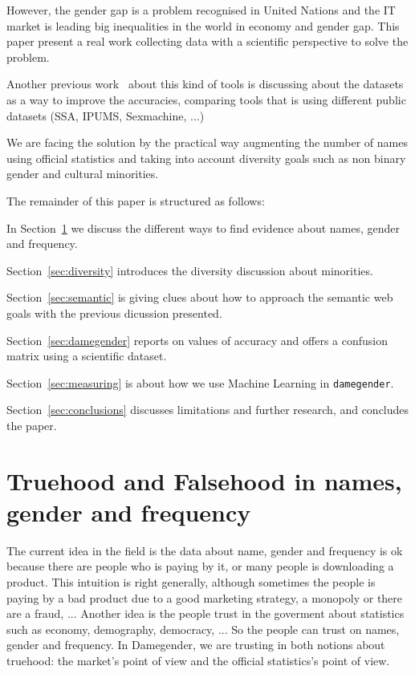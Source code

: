\documentclass[a4paper]{article}
\begin{document}
However, the gender gap is a problem recognised in United Nations and
the IT market is leading big inequalities in the world in economy and
gender gap. This paper present a real work collecting data with a
scientific perspective to solve the problem.

Another previous work~\cite{karimi2016inferring} about this kind of
tools is discussing about the datasets as a way to improve the
accuracies, comparing tools that is using different public datasets
(SSA, IPUMS, Sexmachine, ...)

We are facing the solution by the practical way augmenting the number
of names using official statistics and taking into account diversity
goals such as non binary gender and cultural minorities.

The remainder of this paper is structured as follows:

In Section~\ref{sec:truehood} we discuss the different ways to find
evidence about names, gender and frequency.

Section~\ref{sec:diversity} introduces the diversity discussion about
minorities.

Section~\ref{sec:semantic} is giving clues about how to approach the
semantic web goals with the previous dicussion presented.

Section~\ref{sec:damegender} reports on values of accuracy and offers
a confusion matrix using a scientific dataset.

Section~\ref{sec:measuring} is about how we use Machine Learning in
\texttt{damegender}.

Section~\ref{sec:conclusions} discusses limitations and further
research, and concludes the paper.

\section{Truehood and Falsehood in names, gender and frequency}
\label{sec:truehood}

The current idea in the field is the data about name, gender and
frequency is ok because there are people who is paying by it, or many
people is downloading a product. This intuition is right generally,
although sometimes the people is paying by a bad product due to a good
marketing strategy, a monopoly or there are a fraud, ... Another idea
is the people trust in the goverment about statistics such as economy,
demography, democracy, ... So the people can trust on names, gender
and frequency. In Damegender, we are trusting in both notions about
truehood: the market's point of view and the official statistics's
point of view.
\end{document}
